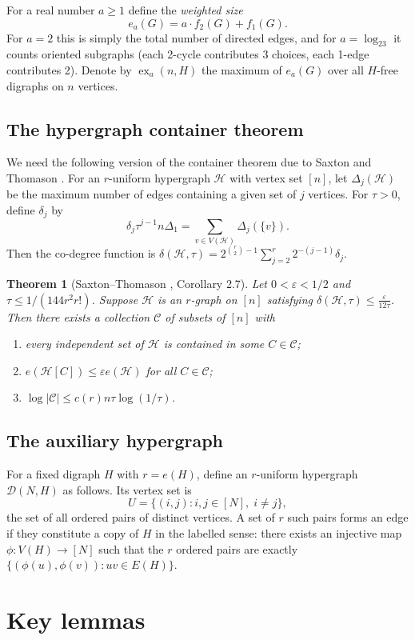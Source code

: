 \documentclass[11pt,a4paper]{article}
\newtheorem{theorem}{Theorem}[section]
\DeclareMathOperator{\ex}{ex}
\newcommand{\cC}{\mathcal{C}}
\newcommand{\cD}{\mathcal{D}}
\newcommand{\cH}{\mathcal{H}}
\newcommand{\eps}{\varepsilon}
\begin{document}
For a real number $a\ge1$ define the \emph{weighted size}
\[
e_a(G)=a\cdot f_2(G)+f_1(G).
\]
For $a=2$ this is simply the total number of directed edges, and for $a=\log_23$ it counts oriented subgraphs (each 2-cycle contributes 3 choices, each 1-edge contributes 2). Denote by $\ex_a(n,H)$ the maximum of $e_a(G)$ over all $H$-free digraphs on $n$ vertices.

\subsection{The hypergraph container theorem}
We need the following version of the container theorem due to Saxton and Thomason \cite[Corollary 2.7]{SAX2015}. For an $r$-uniform hypergraph $\cH$ with vertex set $[n]$, let $\Delta_j(\cH)$ be the maximum number of edges containing a given set of $j$ vertices. For $\tau>0$, define $\delta_j$ by
\[
\delta_j\tau^{j-1}n\Delta_1 = \sum_{v\in V(\cH)}\Delta_j(\{v\}).
\]
Then the co-degree function is $\delta(\cH,\tau)=2^{\binom{r}{2}-1}\sum_{j=2}^r2^{-(j-1)}\delta_j$.

\begin{theorem}[Saxton–Thomason \cite{SAX2015}, Corollary 2.7]
Let $0<\eps<1/2$ and $\tau\le 1/(144 r^2 r!)$. Suppose $\cH$ is an $r$-graph on $[n]$ satisfying $\delta(\cH,\tau)\le \frac{\eps}{12\tau}$. Then there exists a collection $\cC$ of subsets of $[n]$ with
\begin{enumerate}
\item every independent set of $\cH$ is contained in some $C\in\cC$;
\item $e(\cH[C])\le\eps e(\cH)$ for all $C\in\cC$;
\item $\log|\cC|\le c(r) n\tau\log(1/\tau)$.
\end{enumerate}
\end{theorem}

\subsection{The auxiliary hypergraph}
For a fixed digraph $H$ with $r=e(H)$, define an $r$-uniform hypergraph $\cD(N,H)$ as follows. Its vertex set is
\[
U=\{(i,j):i,j\in[N],\;i\neq j\},
\]
the set of all ordered pairs of distinct vertices. A set of $r$ such pairs forms an edge if they constitute a copy of $H$ in the labelled sense: there exists an injective map $\phi:V(H)\to[N]$ such that the $r$ ordered pairs are exactly $\{(\phi(u),\phi(v)):uv\in E(H)\}$.

\section{Key lemmas}
\end{document}
